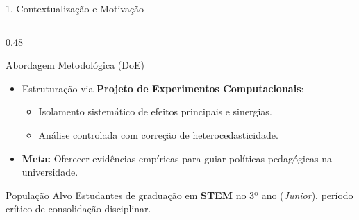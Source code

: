 \documentclass[aspectratio=169, 10pt]{beamer}
\begin{document}
\begin{frame}{1. Contextualização e Motivação}
\begin{columns}[T]
        \begin{column}{0.48\textwidth}
            \begin{block}{Abordagem Metodológica (DoE)}
                \begin{itemize}\setlength{\itemsep}{5pt}
                    \item Estruturação via \textbf{Projeto de Experimentos Computacionais}:
                    \begin{itemize}
                        \item Isolamento sistemático de efeitos principais e sinergias.
                        \item Análise controlada com correção de heterocedasticidade.
                    \end{itemize}
                    \item \textbf{Meta:} Oferecer evidências empíricas para guiar políticas pedagógicas na universidade.
                \end{itemize}
            \end{block}
            \begin{exampleblock}{População Alvo}
                Estudantes de graduação em \textbf{STEM} no 3º ano (\textit{Junior}), período crítico de consolidação disciplinar.
            \end{exampleblock}
        \end{column}
    \end{columns}
\end{frame}
\end{document}
